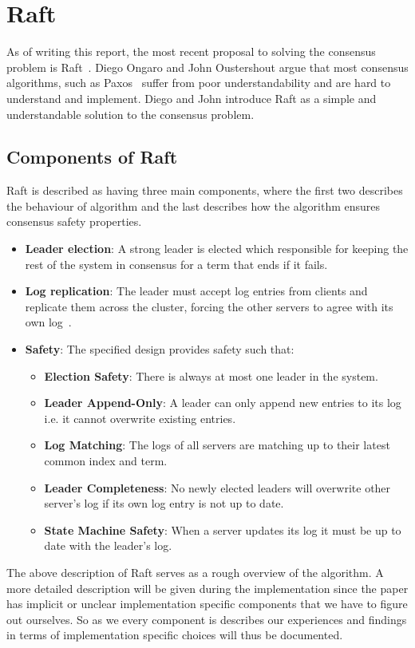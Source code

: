 \section{Raft}
\label{sec:raft}
As of writing this report, the most recent proposal to solving the consensus problem is Raft~\cite{Raft}. Diego Ongaro and John Oustershout argue that most consensus algorithms, such as Paxos~\cite{Paxos} suffer from poor understandability and are hard to understand and implement. Diego and John introduce Raft as a simple and understandable solution to the consensus problem.

\subsection{Components of Raft}
Raft is described as having three main components, where the first two describes the behaviour of algorithm and the last describes how the algorithm ensures consensus safety properties.

\begin{itemize}
  \item \textbf{Leader election}: A strong leader is elected which responsible for keeping the rest of the system in consensus for a term that ends if it fails.
  \item \textbf{Log replication}: The leader must accept log entries from clients and replicate them across the cluster, forcing the other servers to agree with its own log~\cite{Raft}.
  \item \textbf{Safety}: The specified design provides safety such that\cite{Raft}:
      \begin{itemize}
        \item \textbf{Election Safety}: There is always at most one leader in the system.
        \item \textbf{Leader Append-Only}: A leader can only append new entries to its log i.e. it cannot overwrite existing entries.
        \item \textbf{Log Matching}: The logs of all servers are matching up to their latest common index and term.
        \item \textbf{Leader Completeness}: No newly elected leaders will overwrite other server's log if its own log entry is not up to date.
        \item \textbf{State Machine Safety}: When a server updates its log it must be up to date with the leader's log.
      \end{itemize}
\end{itemize}


The above description of Raft serves as a rough overview of the algorithm. A more detailed description will be given during the implementation since the paper has implicit or unclear implementation specific components that we have to figure out ourselves. So as we every component is describes our experiences and findings in terms of implementation specific choices will thus be documented.
